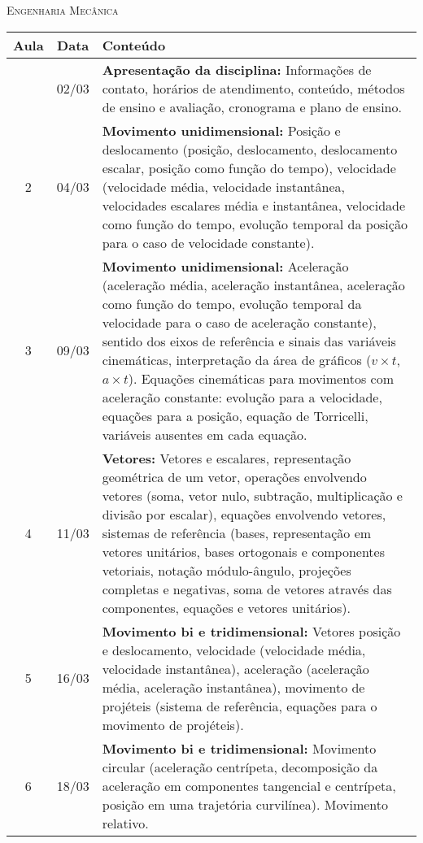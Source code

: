 \vspace{1cm}
\begin{center}
\Large\textsc{Engenharia Mecânica}
\end{center}
\begin{center}
\begin{longtable}{ccp{70mm}}
\toprule
Aula & Data & Conteúdo \\
\midrule
\endhead
\bottomrule
\endfoot
  1 & 02/03 & \textbf{Apresentação da disciplina:} Informações de contato, horários de atendimento, conteúdo, métodos de ensino e avaliação, cronograma e plano de ensino.\\
  2 & 04/03 & \textbf{Movimento unidimensional:} Posição e deslocamento (posição, deslocamento, deslocamento escalar, posição como função do tempo), velocidade (velocidade média, velocidade instantânea, velocidades escalares média e instantânea, velocidade como função do tempo, evolução temporal da posição para o caso de velocidade constante).\\
  3 & 09/03 & \textbf{Movimento unidimensional:} Aceleração (aceleração média, aceleração instantânea, aceleração como função do tempo, evolução temporal da velocidade para o caso de aceleração constante), sentido dos eixos de referência e sinais das variáveis cinemáticas, interpretação da área de gráficos ($v \times t$, $a \times  t$). Equações cinemáticas para movimentos com aceleração constante: evolução para a velocidade, equações para a posição, equação de Torricelli, variáveis ausentes em cada equação.\\
  4 & 11/03 & \textbf{Vetores:} Vetores e escalares, representação geométrica de um vetor, operações envolvendo vetores (soma, vetor nulo, subtração, multiplicação e divisão por escalar), equações envolvendo vetores, sistemas de referência (bases, representação em vetores unitários, bases ortogonais e componentes vetoriais, notação módulo-ângulo, projeções completas e negativas, soma de vetores através das componentes, equações e vetores unitários). \\
  5 & 16/03 & \textbf{Movimento bi e tridimensional:} Vetores posição e deslocamento, velocidade (velocidade média, velocidade instantânea), aceleração (aceleração média, aceleração instantânea), movimento de projéteis (sistema de referência, equações para o movimento de projéteis). \\
  6 & 18/03 & \textbf{Movimento bi e tridimensional:} Movimento circular (aceleração centrípeta, decomposição da aceleração em componentes tangencial e centrípeta, posição em uma trajetória curvilínea). Movimento relativo.\\

\end{longtable}
\end{center}
